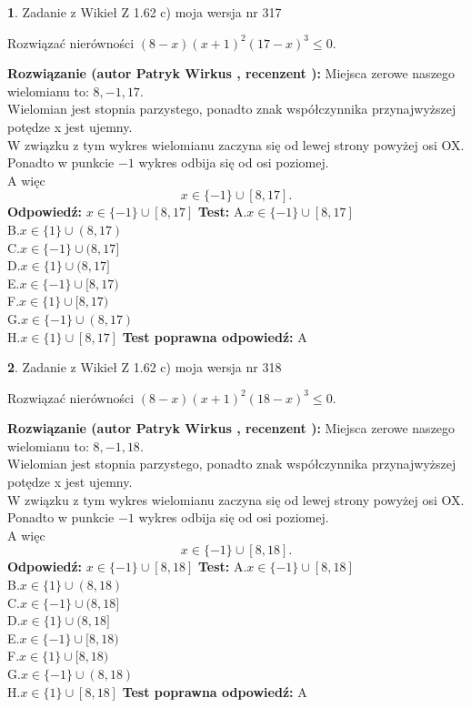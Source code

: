 \documentclass[12pt, a4paper]{article}
\theoremstyle{definition} %
\newtheorem{zad}{}
\newcommand{\zadStart}[1]{\begin{zad}#1\newline}
\newcommand{\zadStop}{\end{zad}}
\newcommand{\rozwStart}[2]{\noindent \textbf{Rozwiązanie (autor #1 , recenzent #2): }\newline}
\newcommand{\rozwStop}{\newline}
\newcommand{\odpStart}{\noindent \textbf{Odpowiedź:}\newline}
\newcommand{\odpStop}{\newline}
\newcommand{\testStart}{\noindent \textbf{Test:}\newline}
\newcommand{\testStop}{\newline}
\newcommand{\kluczStart}{\noindent \textbf{Test poprawna odpowiedź:}\newline}
\newcommand{\kluczStop}{\newline}
\begin{document}
\zadStart{Zadanie z Wikieł Z 1.62 c) moja wersja nr 317}

Rozwiązać nierówności $(8-x)(x+1)^{2}(17-x)^{3}\le0$.
\zadStop
\rozwStart{Patryk Wirkus}{}
Miejsca zerowe naszego wielomianu to: $8, -1, 17$.\\
Wielomian jest stopnia parzystego, ponadto znak współczynnika przy\linebreak najwyższej potędze x jest ujemny.\\ W związku z tym wykres wielomianu zaczyna się od lewej strony powyżej osi OX.\\
Ponadto w punkcie $-1$ wykres odbija się od osi poziomej.\\
A więc $$x \in \{-1\} \cup [8,17].$$
\rozwStop
\odpStart
$x \in \{-1\} \cup [8,17]$
\odpStop
\testStart
A.$x \in \{-1\} \cup [8,17]$\\
B.$x \in \{1\} \cup (8,17)$\\
C.$x \in \{-1\} \cup (8,17]$\\
D.$x \in \{1\} \cup (8,17]$\\
E.$x \in \{-1\} \cup [8,17)$\\
F.$x \in \{1\} \cup [8,17)$\\
G.$x \in \{-1\} \cup (8,17)$\\
H.$x \in \{1\} \cup [8,17]$
\testStop
\kluczStart
A
\kluczStop



\zadStart{Zadanie z Wikieł Z 1.62 c) moja wersja nr 318}

Rozwiązać nierówności $(8-x)(x+1)^{2}(18-x)^{3}\le0$.
\zadStop
\rozwStart{Patryk Wirkus}{}
Miejsca zerowe naszego wielomianu to: $8, -1, 18$.\\
Wielomian jest stopnia parzystego, ponadto znak współczynnika przy\linebreak najwyższej potędze x jest ujemny.\\ W związku z tym wykres wielomianu zaczyna się od lewej strony powyżej osi OX.\\
Ponadto w punkcie $-1$ wykres odbija się od osi poziomej.\\
A więc $$x \in \{-1\} \cup [8,18].$$
\rozwStop
\odpStart
$x \in \{-1\} \cup [8,18]$
\odpStop
\testStart
A.$x \in \{-1\} \cup [8,18]$\\
B.$x \in \{1\} \cup (8,18)$\\
C.$x \in \{-1\} \cup (8,18]$\\
D.$x \in \{1\} \cup (8,18]$\\
E.$x \in \{-1\} \cup [8,18)$\\
F.$x \in \{1\} \cup [8,18)$\\
G.$x \in \{-1\} \cup (8,18)$\\
H.$x \in \{1\} \cup [8,18]$
\testStop
\kluczStart
A
\kluczStop
\end{document}
